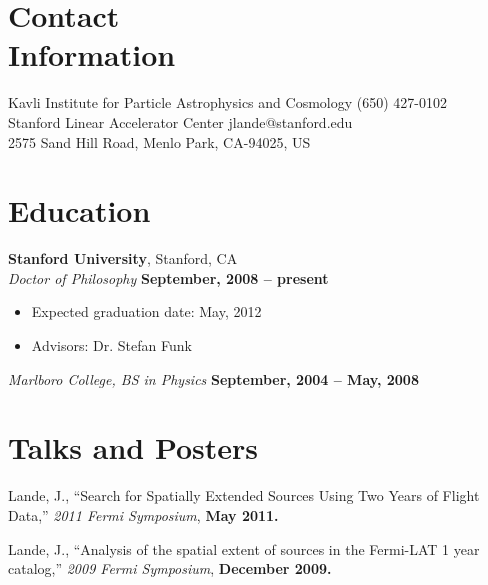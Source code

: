 \documentclass[margin,12pt,line]{resume}
\begin{document}

\begin{resume}

    \section{Contact\\Information}


    Kavli Institute for Particle Astrophysics and Cosmology \hfill (650) 427-0102       \\
    Stanford Linear Accelerator Center                      \hfill jlande@stanford.edu  \\
    2575 Sand Hill Road, Menlo Park, CA-94025, US                                       \\


    \section{Education}

    \textbf{Stanford University}, Stanford, CA \\
    \textsl{Doctor of Philosophy} \hfill \textbf{ September, 2008 -- present}\vspace{-3mm}\\\vspace{-1mm}%
    \begin{itemize}
        \item Expected graduation date: May, 2012
        \item Advisors:  Dr. Stefan Funk
    \end{itemize}

    \textsl{Marlboro College, BS in Physics} \hfill \textbf{September, 2004 -- May, 2008}\vspace{-3mm}\\\vspace{-1mm}%

  \section{Talks and Posters}

      Lande, J., ``Search for Spatially Extended Sources Using Two Years of Flight Data,'' 
      \textsl{2011 Fermi Symposium}, \hfill \textbf{May 2011.}

      Lande, J., ``Analysis of the spatial extent of sources in the Fermi-LAT 1 year catalog,'' 
      \textsl{2009 Fermi Symposium}, \hfill \textbf{December 2009.}


\end{resume}
\end{document}

